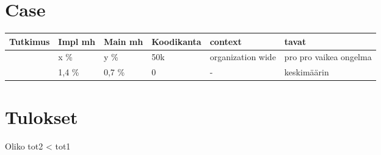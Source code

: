 \documentclass[finnish]{tktltiki2}
\theoremstyle{definition}
\theoremstyle{remark}
\begin{document}
\section{Case}
\begin{center}
    \begin{tabular}{ | l | l | l | l | l | p{4cm} |}
    \hline
    Tutkimus & Impl mh & Main mh & Koodikanta & context & tavat \\ \hline
    	\cite{case} & x \% & y \% & 50k & organization wide & pro pro vaikea ongelma \\ \hline
	\cite{costandbenefit} & 1,4 \% & 0,7 \% & 0 & - & keskimäärin \\ \hline
    \end{tabular}
\end{center}

\section{Tulokset}
Oliko tot2 < tot1


%
%
% 
%



\end{document}
